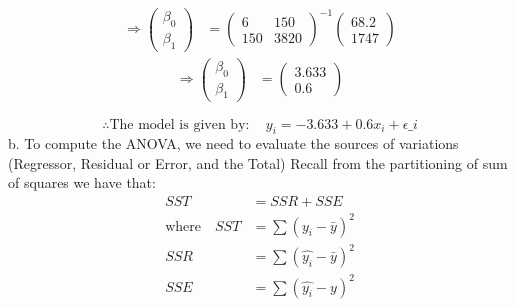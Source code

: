 \documentclass[
]{article}
\begin{document}
\begin{align*}
  \Rightarrow
    \begin{pmatrix}
      \beta_0\\
      \beta_1
    \end{pmatrix}
    & =
    \begin{pmatrix}
    6 & 150\\
    150 & 3820
  \end{pmatrix}^{-1}
  
  \begin{pmatrix}
    68.2 \\
    1747
  \end{pmatrix}
\end{align*} \begin{align*}
  \Rightarrow
    \begin{pmatrix}
      \beta_0\\
      \beta_1
    \end{pmatrix}
    & =
    \begin{pmatrix}
    3.633\\
    0.6
  \end{pmatrix}
\end{align*}

\[
\therefore \text{The model is given by} \colon \quad  y_i = -3.633 + 0.6x_i + \epsilon\_i
\] b. To compute the ANOVA, we need to evaluate the sources of
variations (Regressor, Residual or Error, and the Total) Recall from the
partitioning of sum of squares we have that: \begin{align*}
    SST & = SSR + SSE \\ 
    \text{where} \quad SST & = \sum {(y_i - \bar{y})}^2 \\
    SSR & = \sum {(\hat{y_i} - \bar{y})}^2  \\
    SSE & = \sum {(\hat{y_i} - y)}^2
      \end{align*}
\end{document}
